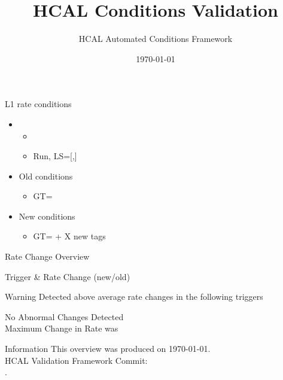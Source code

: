 \documentclass{beamer}
\title{HCAL Conditions Validation}
\author{HCAL Automated Conditions Framework}
\institute{CERN}
\date{\today}
\begin{document}
\frame{\titlepage}



\begin{frame}{L1 rate conditions}
    \begin{itemize}
        \item {}
            \begin{itemize}
                \item {}
                \item Run, LS=[,]
            \end{itemize}
    \end{itemize}

    \begin{itemize}
        \item Old conditions
            \begin{itemize}
                \item GT=
            \end{itemize}
        \item New conditions
            \begin{itemize}
                \item GT= + X new tags
            \end{itemize}
     \end{itemize}
\end{frame}


\begin{frame}{Rate Change Overview}

\begin{center}
        Trigger & Rate Change (new/old) \\ \hline
          

    \begin{alertblock}{Warning}
        \large Detected above average rate changes in the following triggers\\
         
    \end{alertblock}
    \centering
    \Large No Abnormal Changes Detected \\
    Maximum Change in Rate was 
\end{center}

\end{frame}



\begin{frame}{Information}
    This overview was produced on \today.\\
    HCAL Validation Framework Commit: \\
    .
\end{frame}
\end{document}
